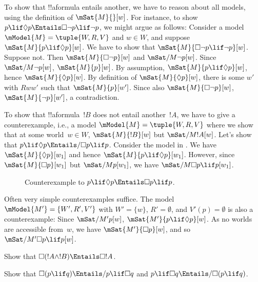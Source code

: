 \documentclass[../../../include/open-logic-section]{subfiles}
\begin{document}
\begin{ex}
  To show that !!a{formula} entails another, we have to reason about
  all models, using the definition of $\mSat{M}{}[w]$. For instance,
  to show $p \lif \Diamond p \Entails \Box\lnot p \lif \lnot p$, we
  might argue as follows: Consider a model $\mModel{M} = \tuple{W, R,
    V}$ and $w \in W$, and suppose $\mSat{M}{p \lif \Diamond
    p}[w]$. We have to show that $\mSat{M}{\Box\lnot p \lif \lnot
    p}[w]$. Suppose not. Then $\mSat{M}{\Box\lnot p}[w]$ and
  $\mSat/{M}{\lnot p}[w]$. Since $\mSat/{M}{\lnot p}[w]$, $\mSat{M}{
    p}[w]$. By assumption, $\mSat{M}{p \lif \Diamond p}[w]$, hence
  $\mSat{M}{\Diamond p}[w]$. By definition of $\mSat{M}{\Diamond
    p}[w]$, there is some $w'$ with $Rww'$ such that
  $\mSat{M}{p}[w']$. Since also $\mSat{M}{\Box \lnot p}[w]$,
  $\mSat{M}{\lnot p}[w']$, a contradiction.

  To show that !!a{formula}~$!B$ does not entail another~$!A$, we have
  to give a counterexample, i.e., a model $\mModel{M} = \tuple{W, R,
    V}$ where we show that at some world~$w \in W$, $\mSat{M}{!B}[w]$
  but $\mSat/{M}{!A}[w]$. Let's show that $p \lif \Diamond p \Entails/
  \Box p \lif p$. Consider the model in .  We
  have $\mSat{M}{\Diamond p}[w_1]$ and hence $\mSat{M}{p \lif
    \Diamond p}[w_1]$. However, since $\mSat{M}{\Box p}[w_1]$ but
  $\mSat/{M}{p}[w_1]$, we have $\mSat/{M}{\Box p \lif p}[w_1]$.
  \begin{figure}
  \begin{center}
  \end{center}
\caption{Counterexample to $p \lif \Diamond p
  \Entails \Box p \lif p$.}
  \end{figure}
  
  Often very simple counterexamples suffice. The model $\mModel{M'} =
  \{W', R', V'\}$ with $W' = \{w\}$, $R' = \emptyset$, and $V'(p) =
  \emptyset$ is also a counterexample: Since $\mSat/{M'}{p}[w]$,
  $\mSat{M'}{p \lif \Diamond p}[w]$. As no worlds are accessible
  from~$w$, we have $\mSat{M'}{\Box p}[w]$, and so $\mSat/{M'}{\Box p
    \lif p}[w]$.
\end{ex}

\begin{prob}
  Show that $\Box (!A \land !B) \Entails \Box !A$.
\end{prob}

\begin{prob}
  Show that $\Box (p \lif q) \Entails/ p \lif \Box q$ and $p \lif \Box
  q \Entails/\Box (p \lif q)$.
\end{prob}
\end{document}
